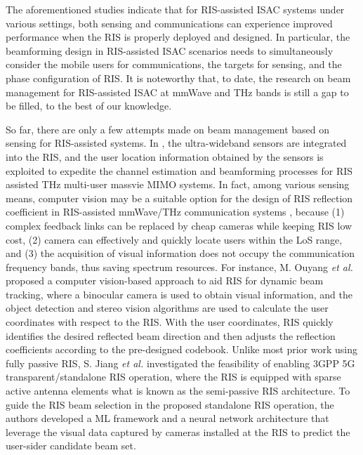\documentclass[journal,comsoc]{IEEEtran}
\begin{document}
The aforementioned studies indicate that for RIS-assisted ISAC systems under various settings, both sensing and communications can experience improved performance when the RIS is properly deployed and designed. In particular, the beamforming design in RIS-assisted ISAC scenarios needs to simultaneously consider the mobile users for communications, the targets for sensing, and the phase configuration of RIS. It is noteworthy that, to date, the research on beam management for RIS-assisted ISAC at mmWave and THz bands is still a gap to be filled, to the best of our knowledge.


So far, there are only a few attempts made on beam management based on sensing for RIS-assisted systems. In \cite{Joint-Hybrid-3D-Beamforming-2022}, the ultra-wideband sensors are integrated into the RIS, and the user location information obtained by the sensors is exploited to expedite the channel estimation and beamforming processes for RIS assisted THz multi-user massvie MIMO systems. In fact, among various sensing means, computer vision may be a suitable option for the design of RIS reflection coefficient in RIS-assisted mmWave/THz communication systems \cite{Computer-Vision-Aided-RIS-Beam-Tracking}, because (1) complex feedback links can be replaced by cheap cameras while keeping RIS low cost, (2) camera can effectively and quickly locate users within the LoS range, and (3) the acquisition of visual information does not occupy the communication frequency bands, thus saving spectrum resources. For instance, M. Ouyang \emph{et al.} \cite{Computer-Vision-Aided-RIS-Beam-Tracking} proposed a computer vision-based approach to aid RIS for dynamic beam tracking, where a binocular camera is used to obtain visual information, and the object detection and stereo vision algorithms are used to calculate the user coordinates with respect to the RIS. With the user coordinates, RIS quickly identifies the desired reflected beam direction and then adjusts the reflection coefficients according to the pre-designed codebook. Unlike most prior work using fully passive RIS, S. Jiang \emph{et al.} \cite{Sensing-Aided-RIS-3GPP-5G} investigated the feasibility of enabling 3GPP 5G transparent/standalone RIS operation, where the RIS is equipped with sparse active antenna elements what is known as the semi-passive RIS architecture. To guide the RIS beam selection in the proposed standalone RIS operation, the authors developed a ML framework and a neural network architecture that leverage the visual data captured by cameras installed at the RIS to predict the user-sider candidate beam set.
\end{document}
